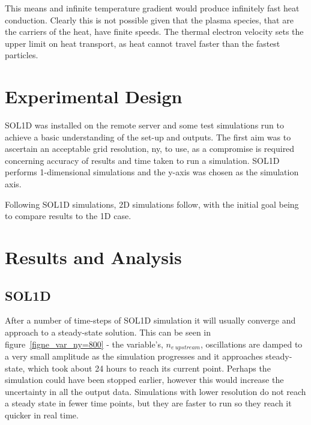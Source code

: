 \documentclass[11pt]{article}  %
\providecommand{\neupstream}{$n_{e~upstream}$} %
\begin{document}
This means and infinite temperature gradient would produce infinitely fast heat conduction. Clearly this is not possible given that the plasma species, that are the carriers of the heat, have finite speeds. The thermal electron velocity sets the upper limit on heat transport, as heat cannot travel faster than the fastest particles. 


\section{Experimental Design}\label{secExpt}
SOL1D was installed on the remote server and some test simulations run to achieve a basic understanding of the set-up and outputs. The first aim was to ascertain an acceptable grid resolution, ny, to use, as a compromise is required concerning accuracy of results and time taken to run a simulation. SOL1D performs 1-dimensional simulations and the y-axis was chosen as the simulation axis. 

Following SOL1D simulations, 2D simulations follow, with the initial goal being to compare results to the 1D case.

\section{Results and Analysis}\label{secResults}
\subsection{SOL1D}\label{ssecSOL1D}
After a number of time-steps of SOL1D simulation it will usually converge and approach to a steady-state solution. This can be seen in figure~\ref{figne_var_ny=800} - the variable's, \neupstream, oscillations are damped to a very small amplitude as the simulation progresses and it approaches steady-state, which took about 24 hours to reach its current point. Perhaps the simulation could have been stopped earlier, however this would increase the uncertainty in all the output data. Simulations with lower resolution do not reach a steady state in fewer time points, but they are faster to run so they reach it quicker in real time.
\end{document}
